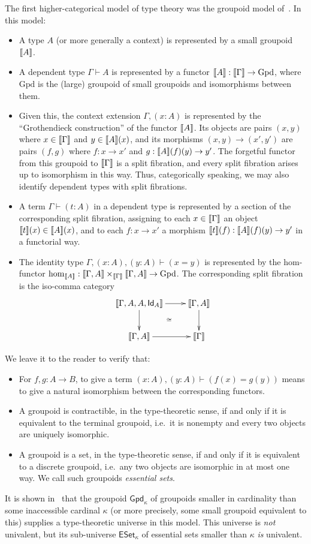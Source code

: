 The first higher-categorical model of type theory was the groupoid model of~\cite{hs:gpd-typethy}.
In this model:
\begin{itemize}
\item A type $A$ (or more generally a context) is represented by a small groupoid $\llbracket A\rrbracket$.
\item A dependent type $\Gamma\vdash A$ is represented by a functor $\llbracket A\rrbracket :\llbracket\Gamma\rrbracket \to \mathrm{Gpd}$, where $\mathrm{Gpd}$ is the (large) groupoid of small groupoids and isomorphisms between them.
\item Given this, the context extension $\Gamma,(x:A)$ is represented by the ``Grothendieck construction'' of the functor $\llbracket A\rrbracket$.
  Its objects are pairs $(x,y)$ where $x\in\llbracket\Gamma\rrbracket$ and $y\in \llbracket A\rrbracket(x)$, and its morphisms $(x,y)\to(x',y')$ are pairs $(f,g)$ where $f:x\to x'$ and $g:\llbracket A\rrbracket(f)(y) \to y'$.
  The forgetful functor from this groupoid to $\llbracket\Gamma\rrbracket$ is a split fibration, and every split fibration arises up to isomorphism in this way.
  Thus, categorically speaking, we may also identify dependent types with split fibrations.
\item A term $\Gamma \vdash (t:A)$ in a dependent type is represented by a section of the corresponding split fibration, assigning to each $x\in\llbracket\Gamma\rrbracket$ an object $\llbracket t\rrbracket(x)\in \llbracket A\rrbracket(x)$, and to each $f:x\to x'$ a morphism $\llbracket t\rrbracket(f):\llbracket A\rrbracket(f)(y) \to y'$ in a functorial way.
\item The identity type $\Gamma,(x:A),(y:A)\vdash (x=y)$ is represented by the hom-functor $\hom_{\llbracket A\rrbracket}: \llbracket\Gamma,A\rrbracket \times_{\llbracket\Gamma\rrbracket} \llbracket\Gamma,A\rrbracket \to \mathrm{Gpd}$.
  The corresponding split fibration is the iso-comma category
  \begin{equation*}
    \vcenter{\xymatrix{
        \m{\Gamma,A,A,\mathsf{Id}_A}\ar[r]\ar[d] \ar@{}[dr]|{\cong} &
        \m{\Gamma,A}\ar[d]\\
        \m{\Gamma,A}\ar[r] &
        \m\Gamma
      }}
  \end{equation*}
\end{itemize}
We leave it to the reader to verify that:
\begin{itemize}
\item For $f,g:A\to B$, to give a term $(x:A),(y:A)\vdash (f(x)=g(y))$ means to give a natural isomorphism between the corresponding functors.
\item A groupoid is contractible, in the type-theoretic sense, if and only if it is equivalent to the terminal groupoid, i.e.\ it is nonempty and every two objects are uniquely isomorphic.
\item A groupoid is a set, in the type-theoretic sense, if and only if it is equivalent to a discrete groupoid, i.e.\ any two objects are isomorphic in at most one way.
  We call such groupoids \emph{essential sets}.
\end{itemize}
It is shown in~\cite{hs:gpd-typethy} that the groupoid $\mathsf{Gpd}_\kappa$ of groupoids smaller in cardinality than some inaccessible cardinal $\kappa$ (or more precisely, some small groupoid equivalent to this) supplies a type-theoretic universe in this model.
This universe is \emph{not} univalent, but its sub-universe $\mathsf{ESet}_\kappa$ of essential sets smaller than $\kappa$ \emph{is} univalent.

